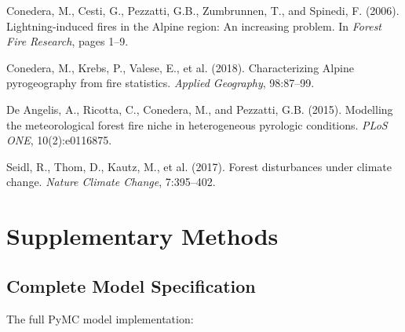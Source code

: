 \documentclass[11pt,a4paper]{article}
\begin{document}

\begin{thebibliography}{99}

Conedera, M., Cesti, G., Pezzatti, G.B., Zumbrunnen, T., and Spinedi, F. (2006).
\newblock Lightning-induced fires in the Alpine region: An increasing problem.
\newblock In \textit{Forest Fire Research}, pages 1--9.

Conedera, M., Krebs, P., Valese, E., et al. (2018).
\newblock Characterizing Alpine pyrogeography from fire statistics.
\newblock \textit{Applied Geography}, 98:87--99.

De Angelis, A., Ricotta, C., Conedera, M., and Pezzatti, G.B. (2015).
\newblock Modelling the meteorological forest fire niche in heterogeneous pyrologic conditions.
\newblock \textit{PLoS ONE}, 10(2):e0116875.

Seidl, R., Thom, D., Kautz, M., et al. (2017).
\newblock Forest disturbances under climate change.
\newblock \textit{Nature Climate Change}, 7:395--402.

\end{thebibliography}

\appendix

\section{Supplementary Methods}

\subsection{Complete Model Specification}

The full PyMC model implementation:
\end{document}
